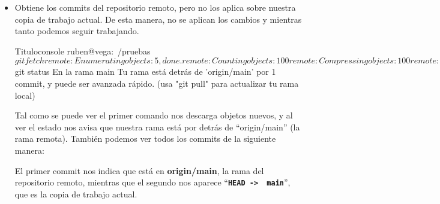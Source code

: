 \begin{itemize}
    \item {}

    Obtiene los commits del repositorio remoto, pero no los aplica sobre nuestra copia de trabajo actual. De esta manera, no se aplican los cambios y mientras tanto podemos seguir trabajando.

\begin{mycode}{Titulo}{console}{}
ruben@vega:~/pruebas$ git fetch
remote: Enumerating objects: 5, done.
remote: Counting objects: 100%
remote: Compressing objects: 100%
remote: Total 3 (delta 0), reused 3 (delta 0), pack-reused 0
Desempaquetando objetos: 100%
Desde github.com:yuki/pruebas
2cac944..97f5359  main       -> origin/main

ruben@vega:~/pruebas$ git status
En la rama main
Tu rama está detrás de 'origin/main' por 1 commit, y puede ser
avanzada rápido. (usa "git pull" para actualizar tu rama local)
\end{mycode}

    Tal como se puede ver el primer comando nos descarga objetos nuevos, y al ver el estado nos avisa que nuestra rama está por detrás de “origin/main” (la rama remota). También podemos ver todos los commits de la siguiente manera:


    El primer commit nos indica que está en \textbf{origin/main}, la rama del repositorio remoto, mientras que el segundo  nos aparece “\textbf{\texttt{HEAD -> \ main}}”, que es la copia de trabajo actual.
\end{itemize}